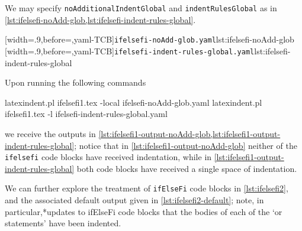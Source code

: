  \begin{example}
 We may specify \texttt{noAdditionalIndentGlobal} and \texttt{indentRulesGlobal} as in
 \cref{lst:ifelsefi-noAdd-glob,lst:ifelsefi-indent-rules-global}.

 \begin{cmhtcbraster}
  [width=.9\linewidth,before=\centering,yaml-TCB]{\texttt{ifelsefi-noAdd-glob.yaml}}{lst:ifelsefi-noAdd-glob}
  [width=.9\linewidth,before=\centering,yaml-TCB]{\texttt{ifelsefi-indent-rules-global.yaml}}{lst:ifelsefi-indent-rules-global}
 \end{cmhtcbraster}

 Upon running the following commands 

 \begin{commandshell}
latexindent.pl ifelsefi1.tex -local ifelsefi-noAdd-glob.yaml  
latexindent.pl ifelsefi1.tex -l ifelsefi-indent-rules-global.yaml  
\end{commandshell}

 we receive the outputs in
 \cref{lst:ifelsefi1-output-noAdd-glob,lst:ifelsefi1-output-indent-rules-global}; notice
 that in \cref{lst:ifelsefi1-output-noAdd-glob} neither of the \texttt{ifelsefi} code
 blocks have received indentation, while in
 \cref{lst:ifelsefi1-output-indent-rules-global} both code blocks have received a single
 space of indentation.

 \begin{cmhtcbraster}
 \end{cmhtcbraster}
 \end{example}

 \begin{example}
 We can further explore the treatment of \texttt{ifElseFi} code blocks in
 \cref{lst:ifelsefi2}, and the associated default output given in
 \cref{lst:ifelsefi2-default}; note, in particular,*{updates to
 ifElseFi code blocks} that the bodies of each of the `or statements' have been indented.%

 \begin{cmhtcbraster}[raster column skip=.1\linewidth]
 \end{cmhtcbraster}
 \end{example}
